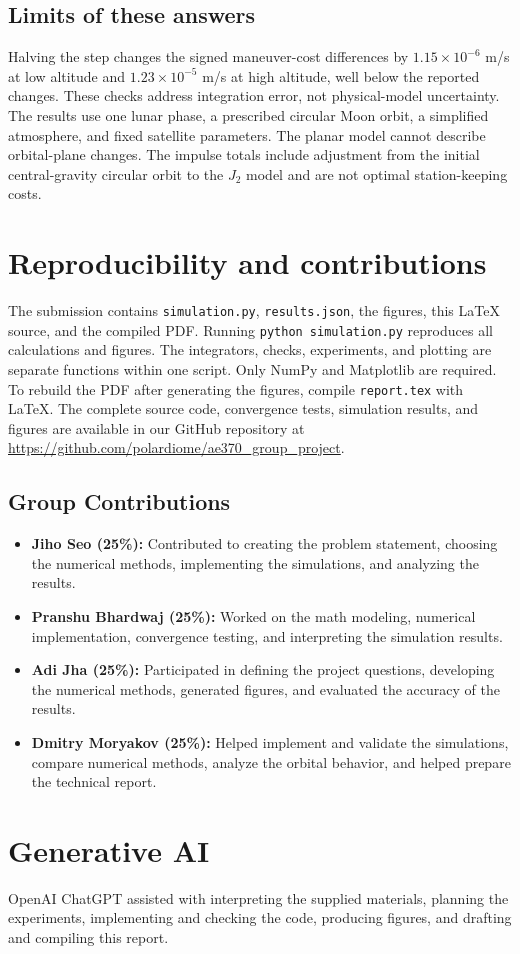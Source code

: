 \documentclass[11pt]{article}
\begin{document}
\subsection*{Limits of these answers}
Halving the step changes the signed maneuver-cost differences by $1.15\times10^{-6}$ m/s at low altitude and $1.23\times10^{-5}$ m/s at high altitude, well below the reported changes. These checks address integration error, not physical-model uncertainty. The results use one lunar phase, a prescribed circular Moon orbit, a simplified atmosphere, and fixed satellite parameters. The planar model cannot describe orbital-plane changes. The impulse totals include adjustment from the initial central-gravity circular orbit to the $J_2$ model and are not optimal station-keeping costs.

\section{Reproducibility and contributions}
The submission contains \texttt{simulation.py}, \texttt{results.json}, the figures, this LaTeX source, and the compiled PDF. Running \texttt{python simulation.py} reproduces all calculations and figures. The integrators, checks, experiments, and plotting are separate functions within one script. Only NumPy and Matplotlib are required. To rebuild the PDF after generating the figures, compile \texttt{report.tex} with LaTeX. The complete source code, convergence tests, simulation results, and figures are available in our GitHub repository at \url{https://github.com/polardiome/ae370_group_project}.

\subsection*{Group Contributions}

\begin{itemize}
    \item \textbf{Jiho Seo (25\%):} Contributed to creating the problem statement, choosing the numerical methods, implementing the simulations, and analyzing the results.

    \item \textbf{Pranshu Bhardwaj (25\%):} Worked on the math modeling, numerical implementation, convergence testing, and interpreting the simulation results.

    \item \textbf{Adi Jha (25\%):} Participated in defining the project questions, developing the numerical methods, generated figures, and evaluated the accuracy of the results.

    \item \textbf{Dmitry Moryakov (25\%):} Helped implement and validate the simulations, compare numerical methods, analyze the orbital behavior, and helped prepare the technical report.
\end{itemize}

\section*{Generative AI}
OpenAI ChatGPT assisted with interpreting the supplied materials, planning the experiments, implementing and checking the code, producing figures, and drafting and compiling this report.
\end{document}
